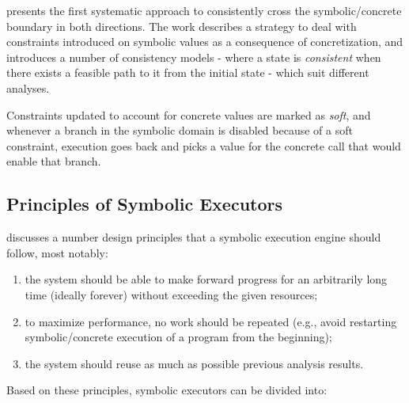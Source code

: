 \cite{CKC-TOCS12} presents the first systematic approach to consistently cross the symbolic/concrete boundary in both directions. The work describes a strategy to deal with constraints introduced on symbolic values as a consequence of concretization, and introduces a number of consistency models - where a state is {\em consistent} when there exists a feasible path to it from the initial state - which suit different analyses.

Constraints updated to account for concrete values are marked as {\em soft}, and whenever a branch in the symbolic domain is disabled because of a soft constraint, execution goes back and picks a value for the concrete call that would enable that branch.


\subsection{Principles of Symbolic Executors}
\label{ss:principles}

\cite{MAYHEM-SP12} discusses a number design principles that a symbolic execution engine should follow, most notably: 
\begin{enumerate}
  \item the system should be able to make forward progress for an arbitrarily long time (ideally forever) without exceeding the given resources;
  \item to maximize performance, no work should be repeated (e.g., avoid restarting symbolic/concrete execution of a program from the beginning);
  \item the system should reuse as much as possible previous analysis results.
\end{enumerate}

\noindent Based on these principles, symbolic executors can be divided into:

